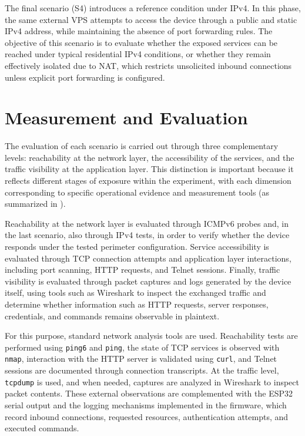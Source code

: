 The final scenario (S4) introduces a reference condition under IPv4. In this phase, the same external VPS attempts to access the device through a public and static IPv4 address, while maintaining the absence of port forwarding rules. The objective of this scenario is to evaluate whether the exposed services can be reached under typical residential IPv4 conditions, or whether they remain effectively isolated due to NAT, which restricts unsolicited inbound connections unless explicit port forwarding is configured.

\section{Measurement and Evaluation}\label{sec:measurement-evaluation} 
The evaluation of each scenario is carried out through three complementary levels: reachability at the network layer, the accessibility of the services, and the traffic visibility at the application layer. This distinction is important because it reflects different stages of exposure within the experiment, with each dimension corresponding to specific operational evidence and measurement tools (as summarized in ).

Reachability at the network layer is evaluated through ICMPv6 probes and, in the last scenario, also through IPv4 tests, in order to verify whether the device responds under the tested perimeter configuration. Service accessibility is evaluated through TCP connection attempts and application layer interactions, including port scanning, HTTP requests, and Telnet sessions. Finally, traffic visibility is evaluated through packet captures and logs generated by the device itself, using tools such as Wireshark to inspect the exchanged traffic and determine whether information such as HTTP requests, server responses, credentials, and commands remains observable in plaintext.

For this purpose, standard network analysis tools are used. Reachability tests are performed using \texttt{ping6} and \texttt{ping}, the state of TCP services is observed with \texttt{nmap}, interaction with the HTTP server is validated using \texttt{curl}, and Telnet sessions are documented through connection transcripts. At the traffic level, \texttt{tcpdump} is used, and when needed, captures are analyzed in Wireshark to inspect packet contents. These external observations are complemented with the ESP32 serial output and the logging mechanisms implemented in the firmware, which record inbound connections, requested resources, authentication attempts, and executed commands.

